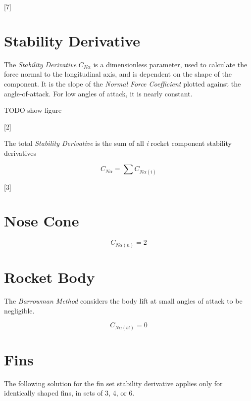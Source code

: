 \documentclass[]{book}
\begin{document}
{[}7{]}

\section{Stability Derivative}\label{stability-derivative}

The \emph{Stability Derivative} \(C_{N\alpha}\) is a dimensionless
parameter, used to calculate the force normal to the longitudinal axis,
and is dependent on the shape of the component. It is the slope of the
\emph{Normal Force Coefficient} plotted against the angle-of-attack. For
low angles of attack, it is nearly constant.

TODO show figure

{[}2{]}

The total \emph{Stability Derivative} is the sum of all \emph{i} rocket
component stability derivatives

\begin{equation}
\label{total_stability_derivative}
C_{N \alpha} = \sum C_{N \alpha (i)}   
\end{equation}

{[}3{]}

\section{Nose Cone}\label{nose-cone}

\begin{equation}
\label{eq_sd_nosecone}
C_{N \alpha (n)} = 2
\end{equation}

\section{Rocket Body}\label{rocket-body}

The \emph{Barrowman Method} considers the body lift at small angles of
attack to be negligible.

\begin{equation}
\label{eq_sd_bodytube}
C_{N \alpha (bt)} = 0
\end{equation}

\section{Fins}\label{fins}

The following solution for the fin set stability derivative applies only
for identically shaped fins, in sets of 3, 4, or 6.
\end{document}
